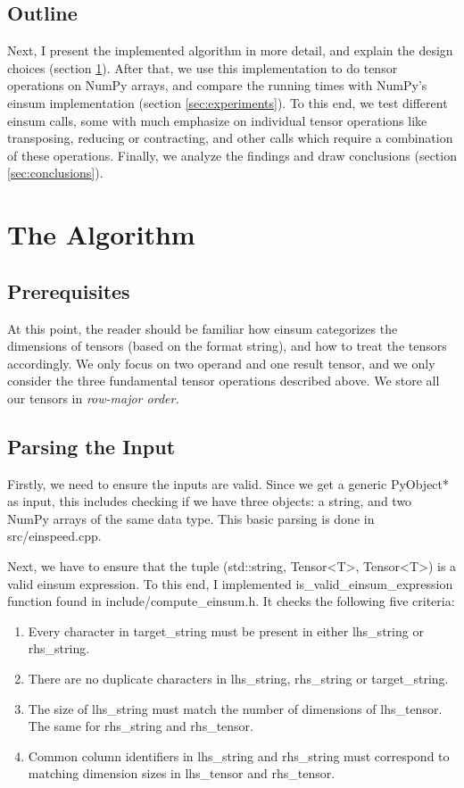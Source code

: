 \documentclass[sigconf]{acmart}
\renewcommand{\texttt}[1]{\begingroup\ttfamily\sloppy\hbadness=10000 #1\endgroup}
\begin{document}
\subsection{Outline}
Next, I present the implemented algorithm in more detail, and explain the design choices (section \ref{sec:algorithm}). After that, we use this implementation to do tensor operations on NumPy arrays, and compare the running times with NumPy's einsum implementation (section \ref{sec:experiments}). To this end, we test different einsum calls, some with much emphasize on individual tensor operations like transposing, reducing or contracting, and other calls which require a combination of these operations.
Finally, we analyze the findings and draw conclusions (section \ref{sec:conclusions}).



\section{The Algorithm}
\label{sec:algorithm}

\subsection{Prerequisites}
At this point, the reader should be familiar how einsum categorizes the dimensions of tensors (based on the format string), and how to treat the tensors accordingly. We only focus on two operand and one result tensor, and we only consider the three fundamental tensor operations described above. We store all our tensors in \em row-major order\em .


\subsection{Parsing the Input}
Firstly, we need to ensure the inputs are valid. Since we get a generic \texttt{PyObject*} as input, this includes checking if we have three objects: a string, and two NumPy arrays of the same data type. This basic parsing is done in \texttt{src/einspeed.cpp}.

Next, we have to ensure that the tuple \texttt{(std::string, Tensor<T>, Tensor<T>)} is a valid einsum expression. To this end, I implemented \texttt{is\_valid\_einsum\_expression} function found in \texttt{include/compute\_einsum.h}. It checks the following five criteria:

\begin{enumerate}
  \item Every character in target\_string must be present in either lhs\_string or rhs\_string.
  \item There are no duplicate characters in lhs\_string, rhs\_string or target\_string.
  \item The size of lhs\_string must match the number of dimensions of lhs\_tensor. The same for rhs\_string and rhs\_tensor.
  \item Common column identifiers in lhs\_string and rhs\_string must correspond to matching dimension sizes in lhs\_tensor and rhs\_tensor.
\end{enumerate}
\end{document}
